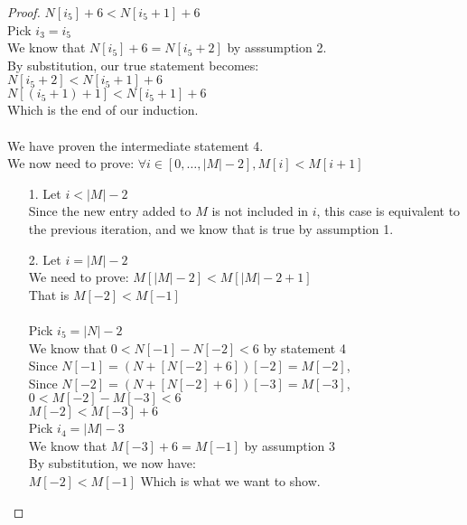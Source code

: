\documentclass[fontsize=11pt]{article}
\begin{document}
\begin{enumerate}
\begin{enumerate}
\begin{proof}
$N[i_5] + 6 < N[i_5 + 1] + 6$ \\
Pick $i_3 = i_5$ \\
We know that $N[i_5] + 6 = N[i_5 + 2]$ by asssumption 2. \\
By substitution, our true statement becomes: \\
$N[i_5 + 2] < N[i_5 + 1] + 6$ \\
$N[(i_5 + 1) + 1] < N[i_5 + 1] + 6$ \\
Which is the end of our induction. \\
\\
We have proven the intermediate statement 4. \\
We now need to prove: $\forall i \in [0, \dots, |M| - 2], M[i] < M[i + 1] $

\begin{enumerate}
    \item[1.] Let $i < |M| - 2$ \\
        Since the new entry added to $M$ is not included in $i$, this case is equivalent to the previous iteration, and we know that is true by assumption 1.

    \item[2.] Let $i = |M| - 2$ \\
        We need to prove: $M[|M| - 2] < M[|M| - 2 + 1]$ \\
        That is $M[-2] < M[-1]$ \\
        \\
        Pick $i_5 = |N| - 2$ \\
        We know that $0 < N[-1] - N[-2] < 6$ by statement 4 \\
        Since $N[-1] = (N + [N[-2] + 6])[-2] = M[-2]$, \\
        Since $N[-2] = (N + [N[-2] + 6])[-3] = M[-3]$, \\
        $0 < M[-2] - M[-3] < 6$ \\
        $M[-2] < M[-3] + 6$ \\
        Pick $i_4 = |M| - 3$ \\
        We know that $M[-3] + 6 = M[-1]$ by assumption 3 \\
        By substitution, we now have: \\
        $M[-2] < M[-1]$
        Which is what we want to show.

\end{enumerate}


\end{proof}


\end{enumerate}
\end{enumerate}
\end{document}
